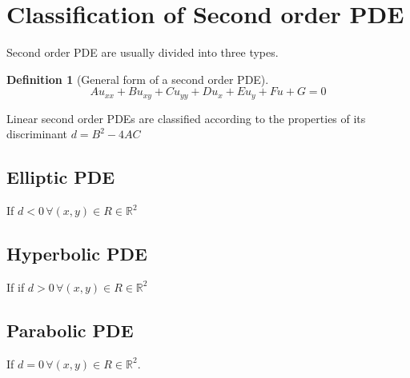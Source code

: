 \documentclass[oneside,11pt,pdftex,final]{book}%
\numberwithin{equation}{section}
\newtheorem{example}[theorem]{Example}
\newtheorem{definition}[theorem]{Definition}
\numberwithin{section}{chapter}
\numberwithin{equation}{chapter}
\newcommand{\R}{\mathbb{R}}
\begin{document}
\section{Classification of Second order PDE}
Second order PDE are usually divided into three types.
\begin{definition}[General form of a second order PDE]\label{def:general2pde}
	\[ A u_{xx}+B u_{xy}+C u_{yy}+Du_x+E u_y +Fu+G=0 \]
\end{definition}
Linear second order PDEs are classified according to the properties of its discriminant $ d=B^2-4AC $
\subsection{Elliptic PDE}
If $ d<0\, \forall (x,y) \in R \in \R^2$

\subsection{Hyperbolic PDE}
If if $ d>0\, \forall (x,y) \in R \in \R^2 $

\subsection{Parabolic PDE}
If $ d=0\, \forall (x,y) \in R \in \R^2 $.

%
%
%
\end{document}
